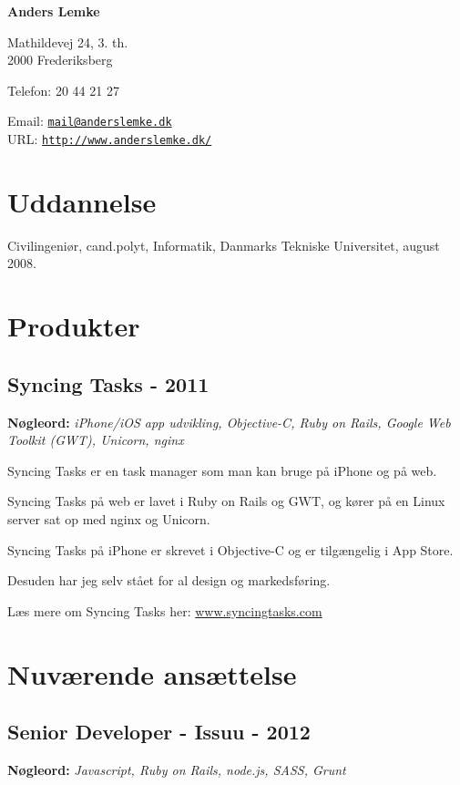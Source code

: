 \documentclass[a4paper]{article}
\newcommand{\keywords}[1]{\small\textbf{Nøgleord:} \emph{#1}\normalsize}
\begin{document}
{\huge\bf Anders Lemke}

\bigskip
Mathildevej 24, 3. th. \\
2000 Frederiksberg

\medskip

Telefon: 20 44 21 27 

\medskip

Email: \href{mailto:mail@anderslemke.dk}{\tt mail@anderslemke.dk} \\
URL: \href{http://www.anderslemke.dk/}{\tt http://www.anderslemke.dk/}

\section*{Uddannelse}

Civilingeniør, cand.polyt, Informatik, Danmarks Tekniske Universitet, august 2008.

\section*{Produkter}

\subsection*{Syncing Tasks - 2011}
\keywords{iPhone/iOS app udvikling, Objective-C, Ruby on Rails, Google Web Toolkit (GWT), Unicorn, nginx}

Syncing Tasks er en task manager som man kan bruge på iPhone og på web. 

Syncing Tasks på web er lavet i Ruby on Rails og GWT, og kører på en Linux server sat op med nginx og Unicorn.

Syncing Tasks på iPhone er skrevet i Objective-C og er tilgængelig i App Store.

Desuden har jeg selv stået for al design og markedsføring.

Læs mere om Syncing Tasks her: \href{http://www.syncingtasks.com}{www.syncingtasks.com}

\section*{Nuværende ansættelse}

\subsection*{Senior Developer - Issuu - 2012}
\keywords{Javascript, Ruby on Rails, node.js, SASS, Grunt}
\end{document}

